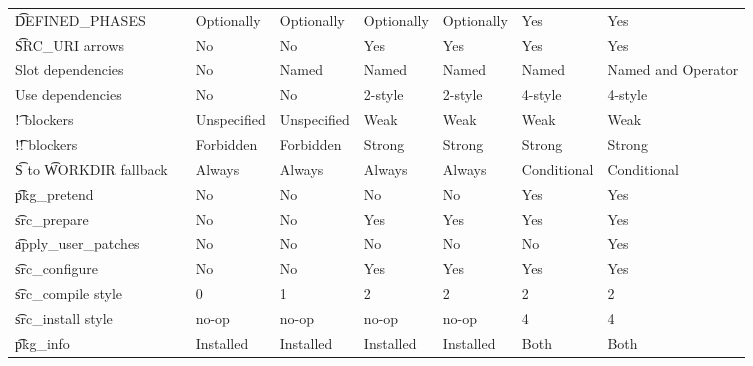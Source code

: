 \begin{landscape}
\begin{longtable}{llP{5em}P{5em}P{6em}P{6em}P{6em}P{6em}}
\t{DEFINED\_PHASES} &  &
    Optionally & Optionally & Optionally & Optionally & Yes & Yes \\

\t{SRC\_URI} arrows &  &
    No & No & Yes & Yes & Yes & Yes \\

Slot dependencies &  &
    No & Named & Named & Named & Named & Named and Operator \\

Use dependencies &  &
    No & No & 2-style & 2-style & 4-style & 4-style \\

\t{!} blockers &  &
    Unspecified & Unspecified & Weak & Weak & Weak & Weak \\

\t{!!} blockers &  &
    Forbidden & Forbidden & Strong & Strong & Strong & Strong \\

\t{S} to \t{WORKDIR} fallback &  &
    Always & Always & Always & Always & Conditional & Conditional \\

\t{pkg\_pretend} &  &
    No & No & No & No & Yes & Yes \\

\t{src\_prepare} &  &
    No & No & Yes & Yes & Yes & Yes \\

\t{apply\_user\_patches} &  &
    No & No & No & No & No & Yes \\

\t{src\_configure} &  &
    No & No & Yes & Yes & Yes & Yes \\

\t{src\_compile} style &  &
    0 & 1 & 2 & 2 & 2 & 2 \\

\t{src\_install} style &  &
    no-op & no-op & no-op & no-op & 4 & 4 \\

\t{pkg\_info} &  &
    Installed & Installed & Installed & Installed & Both & Both \\


\end{longtable}
\end{landscape}

